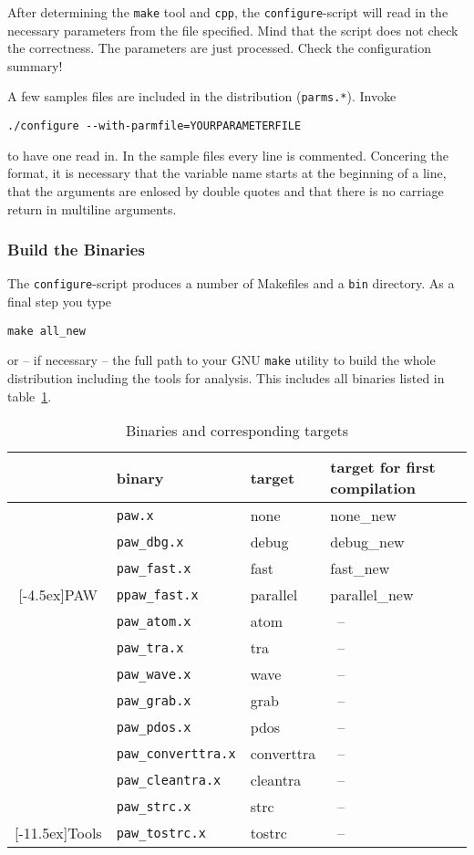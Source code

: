\documentclass[a4paper,10pt]{article}
\newcommand{\PAW}{\textsc{PAW}}
\begin{document}
After determining the \texttt{make} tool and \texttt{cpp}, the
\texttt{configure}-script will read in the necessary parameters from the file
specified. Mind that the script does not check the correctness. The parameters are just processed. Check the configuration summary!

A few samples files are included in the distribution (\texttt{parms.*}).  Invoke 
\begin{verbatim}
./configure --with-parmfile=YOURPARAMETERFILE
\end{verbatim}
to have one read in.  In the sample files every line is commented. Concering
the format, it is necessary that the variable name starts at the beginning of a
line, that the arguments are enlosed by double quotes and that there is no carriage return in multiline arguments.


\subsubsection*{Build the Binaries}
The \texttt{configure}-script produces a number of Makefiles and a \texttt{bin}
directory.  As a final step you type
\begin{verbatim}
make all_new
\end{verbatim}
or -- if necessary -- the full path to your GNU \texttt{make} utility to build
the whole distribution including the tools for analysis. This includes all
binaries listed in table~\ref{tab:bins}.

\begin{table}[h]
\centering
\begin{tabular}{|c|l|l|l|} \hline
          & binary       & target & target for first compilation \\ \hline \hline
          & {\tt paw.x}        & none   & none\_new \\
          & {\tt paw\_dbg.x}    & debug  & debug\_new \\
          & {\tt paw\_fast.x}   & fast   & fast\_new \\
\raisebox{4.5ex}[-4.5ex]{\PAW}  & {\tt ppaw\_fast.x}  & parallel & parallel\_new \\ \hline
          & {\tt paw\_atom.x}  & atom & \ --  \\
          & {\tt paw\_tra.x}   & tra  & \ -- \\
          & {\tt paw\_wave.x}  & wave & \ -- \\
          & {\tt paw\_grab.x}  & grab & \ -- \\
          & {\tt paw\_pdos.x}  & pdos & \ -- \\
          & {\tt paw\_converttra.x} & converttra & \ -- \\
          & {\tt paw\_cleantra.x }  & cleantra   & \ -- \\
          & {\tt paw\_strc.x}       & strc       & \ -- \\
\raisebox{11.5ex}[-11.5ex]{Tools}  & {\tt paw\_tostrc.x}     & tostrc     & \ -- \\ \hline
\end{tabular}
\caption{Binaries and corresponding targets}
\label{tab:bins}
\end{table}
\end{document}
